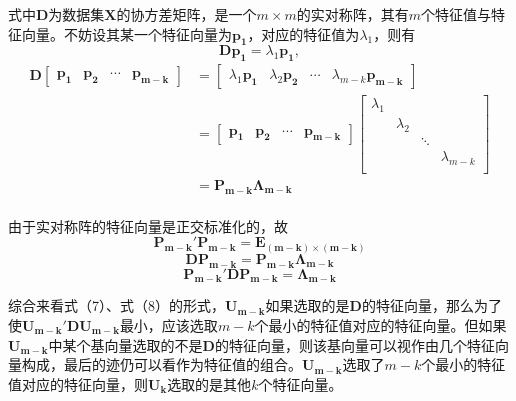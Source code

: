 \documentclass[withoutpreface,bwprint]{cumcmthesis}
\begin{document}
式中$\boldsymbol{D}$为数据集$\boldsymbol{X}$的协方差矩阵，是一个$m\times m$的实对称阵，其有$m$个特征值与特征向量。不妨设其某一个特征向量为$\boldsymbol{p_{1}}$，对应的特征值为$\lambda_{1}$，则有
\begin{equation*}
\boldsymbol{Dp_{1}}=\lambda_{1}\boldsymbol{p_{1}},
\end{equation*}
\begin{equation*}
\begin{aligned}
\boldsymbol{D}\begin{bmatrix}\boldsymbol{p_{1}}&\boldsymbol{p_{2}}&\cdots&\boldsymbol{p_{m-k}}\end{bmatrix}
&=\begin{bmatrix}\lambda_{1}\boldsymbol{p_{1}}&\lambda_{2}\boldsymbol{p_{2}}&\cdots&\lambda_{m-k}\boldsymbol{p_{m-k}}\end{bmatrix}\\
&=\begin{bmatrix}\boldsymbol{p_{1}}&\boldsymbol{p_{2}}&\cdots&\boldsymbol{p_{m-k}}\end{bmatrix}\begin{bmatrix}\lambda_{1}& & & \\ &\lambda_{2}& & \\ & &\ddots& \\ & & &\lambda_{m-k}\\\end{bmatrix}\\
&=\boldsymbol{P_{m-k}\Lambda_{m-k}}\\
\end{aligned}
\end{equation*}

由于实对称阵的特征向量是正交标准化的，故
\begin{equation*}
\boldsymbol{P_{m-k}'P_{m-k}}=\boldsymbol{E_{(m-k)\times (m-k)}}
\end{equation*}
\begin{equation*}
\boldsymbol{DP_{m-k}}=\boldsymbol{P_{m-k}\Lambda_{m-k}}
\end{equation*}
\begin{equation}
\boldsymbol{P_{m-k}'DP_{m-k}}=\boldsymbol{\Lambda_{m-k}}
\end{equation}

综合来看式（7）、式（8）的形式，$\boldsymbol{U_{m-k}}$如果选取的是$\boldsymbol{D}$的特征向量，那么为了使$\boldsymbol{U_{m-k}'DU_{m-k}}$最小，应该选取$m-k$个最小的特征值对应的特征向量。但如果$\boldsymbol{U_{m-k}}$中某个基向量选取的不是$\boldsymbol{D}$的特征向量，则该基向量可以视作由几个特征向量构成，最后的迹仍可以看作为特征值的组合。$\boldsymbol{U_{m-k}}$选取了$m-k$个最小的特征值对应的特征向量，则$\boldsymbol{U_{k}}$选取的是其他$k$个特征向量。
\end{document}
